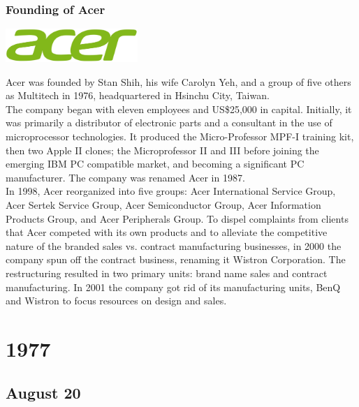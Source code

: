 \documentclass[11pt]{report}
\begin{document}
\subsection{Founding of Acer}
\vspace{2mm}\begin{center}\includegraphics[width=5cm]{./img/acerLogo.jpg}\end{center}
Acer was founded by Stan Shih, his wife Carolyn Yeh, and a group of five others as Multitech in 1976, headquartered in Hsinchu City, Taiwan.\\
\indent The company began with eleven employees and US\$25,000 in capital. Initially, it was primarily a distributor of electronic parts and a consultant in the use of microprocessor technologies. It produced the Micro-Professor MPF-I training kit, then two Apple II clones; the Microprofessor II and III before joining the emerging IBM PC compatible market, and becoming a significant PC manufacturer. The company was renamed Acer in 1987.\\
\indent In 1998, Acer reorganized into five groups: Acer International Service Group, Acer Sertek Service Group, Acer Semiconductor Group, Acer Information Products Group, and Acer Peripherals Group. To dispel complaints from clients that Acer competed with its own products and to alleviate the competitive nature of the branded sales vs. contract manufacturing businesses, in 2000 the company spun off the contract business, renaming it Wistron Corporation. The restructuring resulted in two primary units: brand name sales and contract manufacturing. In 2001 the company got rid of its manufacturing units, BenQ and Wistron to focus resources on design and sales.

\chapter{1977}
\section{August 20}
\end{document}
